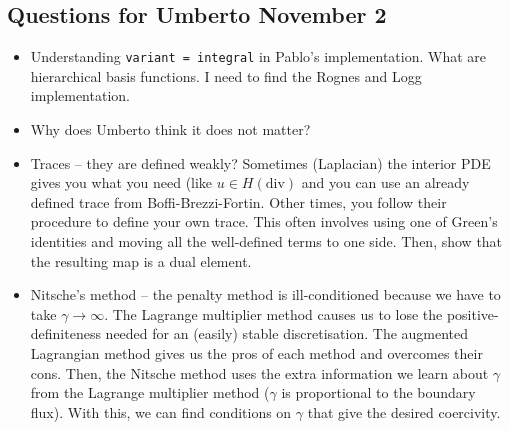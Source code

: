 \documentclass[12pt,a4paper]{article}
\begin{document}
\subsection{Questions for Umberto November 2}

\begin{itemize}
    \item Understanding \texttt{variant = integral} in Pablo's implementation. What are hierarchical basis functions. I need to find the Rognes and Logg implementation.
    \item Why does Umberto think it does not matter?
    \item Traces -- they are defined weakly? Sometimes (Laplacian) the interior PDE gives you what you need (like $u \in H(\text{div})$ and you can use an already defined trace from Boffi-Brezzi-Fortin. Other times, you follow their procedure to define your own trace. This often involves using one of Green's identities and moving all the well-defined terms to one side. Then, show that the resulting map is a dual element. 

    \item Nitsche's method -- the penalty method is ill-conditioned because we have to take $\gamma \rightarrow \infty.$ The Lagrange multiplier method causes us to lose the positive-definiteness needed for an (easily) stable discretisation.  The augmented Lagrangian method gives us the pros of each method and overcomes their cons. Then, the Nitsche method uses the extra information we learn about $\gamma$ from the Lagrange multiplier method ($\gamma$ is proportional to the boundary flux). With this, we can find conditions on $\gamma$ that give the desired coercivity. 
\end{itemize}


\end{document}
